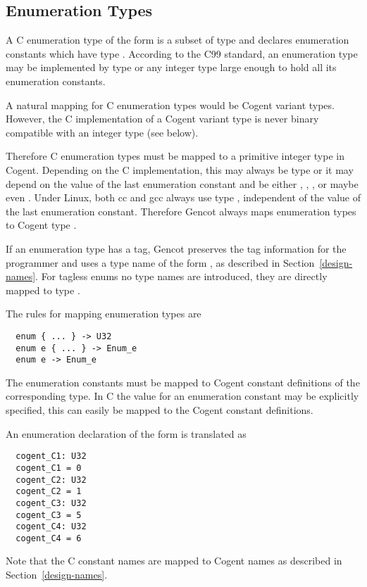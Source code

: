 \subsection{Enumeration Types}
\label{design-types-enum}

A C enumeration type of the form  is a subset of type  and declares enumeration 
constants which have type . According to the C99 standard, an enumeration type may be implemented
by type  or any integer type large enough to hold all its enumeration constants.

A natural mapping for C enumeration types would be Cogent variant types. However, the C implementation
of a Cogent variant type is never binary compatible with an integer type (see below). 

Therefore C enumeration types must be mapped to a primitive integer type in Cogent. Depending on the C
implementation, this may always be type  or it may depend on the value of the last enumeration
constant and be either , , , or maybe even . Under Linux, both cc
and gcc always use type , independent of the value of the last enumeration constant. 
Therefore Gencot always maps enumeration types to Cogent type .

If an enumeration type has a tag, Gencot preserves the tag information for the programmer and uses
a type name of the form , as described in Section~\ref{design-names}. For tagless enums
no type names are introduced, they are directly mapped to type .

The rules for mapping enumeration types are
\begin{verbatim}
  enum { ... } -> U32
  enum e { ... } -> Enum_e
  enum e -> Enum_e
\end{verbatim}

The enumeration constants must be mapped to Cogent constant definitions of the corresponding type. In 
C the value for an enumeration constant may be explicitly specified, this can easily be mapped to
the Cogent constant definitions.

An enumeration declaration of the form  is translated as
\begin{verbatim}
  cogent_C1: U32
  cogent_C1 = 0
  cogent_C2: U32
  cogent_C2 = 1
  cogent_C3: U32
  cogent_C3 = 5
  cogent_C4: U32
  cogent_C4 = 6
\end{verbatim}
Note that the C constant names are mapped to Cogent names as described in Section~\ref{design-names}.


